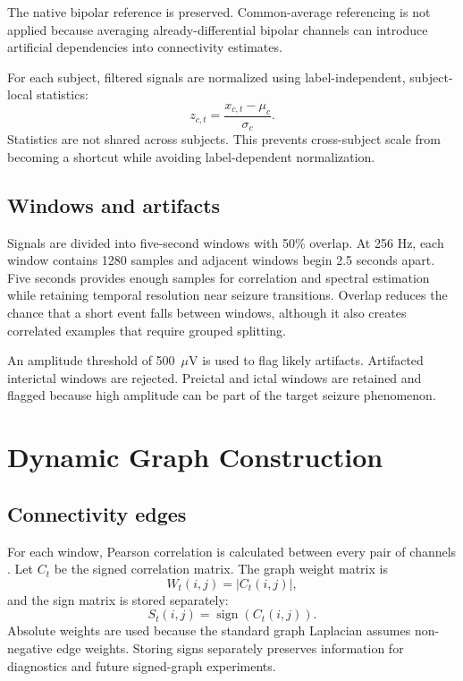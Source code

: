 \documentclass[conference]{IEEEtran}
\begin{document}
The native bipolar reference is preserved. Common-average referencing is not applied because averaging already-differential bipolar channels can introduce artificial dependencies into connectivity estimates.

For each subject, filtered signals are normalized using label-independent, subject-local statistics:
\begin{equation}
 z_{c,t} = \frac{x_{c,t}-\mu_c}{\sigma_c}.
\end{equation}
Statistics are not shared across subjects. This prevents cross-subject scale from becoming a shortcut while avoiding label-dependent normalization.

\subsection{Windows and artifacts}
Signals are divided into five-second windows with 50\% overlap. At 256 Hz, each window contains 1280 samples and adjacent windows begin 2.5 seconds apart. Five seconds provides enough samples for correlation and spectral estimation while retaining temporal resolution near seizure transitions. Overlap reduces the chance that a short event falls between windows, although it also creates correlated examples that require grouped splitting.

An amplitude threshold of 500~$\mu$V is used to flag likely artifacts. Artifacted interictal windows are rejected. Preictal and ictal windows are retained and flagged because high amplitude can be part of the target seizure phenomenon.

\section{Dynamic Graph Construction}
\subsection{Connectivity edges}
For each window, Pearson correlation is calculated between every pair of channels \cite{pearson1895regression}. Let $C_t$ be the signed correlation matrix. The graph weight matrix is
\begin{equation}
 W_t(i,j) = |C_t(i,j)|,
\end{equation}
and the sign matrix is stored separately:
\begin{equation}
 S_t(i,j) = \operatorname{sign}(C_t(i,j)).
\end{equation}
Absolute weights are used because the standard graph Laplacian assumes non-negative edge weights. Storing signs separately preserves information for diagnostics and future signed-graph experiments.
\end{document}
